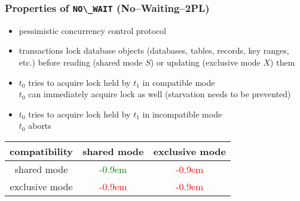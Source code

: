 \begin{frame}
	\frametitle{Properties of \lstinline{NO\_WAIT} (No--Waiting--2PL)}
	
	\begin{itemize}
		\item	pessimistic concurrency control protocol
		\item	transactions lock database objects (databases, tables, records, key ranges, etc.) before reading (shared mode $S$) or updating (exclusive mode $X$) them	\cite{Mohan:1990}
		\item	$t_0$ tries to acquire lock held by $t_1$ in compatible mode \\ \bm{$\rightarrow$} $t_0$ can immediately acquire lock as well (starvation needs to be prevented)
		\item	$t_0$ tries to acquire lock held by $t_1$ in incompatible mode \\ \bm{$\rightarrow$} $t_0$ aborts
	\end{itemize}
	\newcommand{\plus}{\textcolor{green!15}{\LARGE\raisebox{-.0875em}{\bm{$\bullet$}}}\textcolor{green}{\kern-0.9em\bm{$\oplus$}}}
	\newcommand{\minus}{\textcolor{red!25}{\LARGE\raisebox{-.0875em}{\bm{$\bullet$}}}\textcolor{red}{\kern-0.9em\bm{$\ominus$}}}
	
	\centering
	\begin{tabular}{| c | c | c |}
															\hline
		compatibility	&	shared mode	&	exclusive mode		\\	\hline
		shared mode	&	\plus			&	\minus			\\	\hline
		exclusive mode	&	\minus		&	\minus			\\	\hline
	\end{tabular}%
\end{frame}

